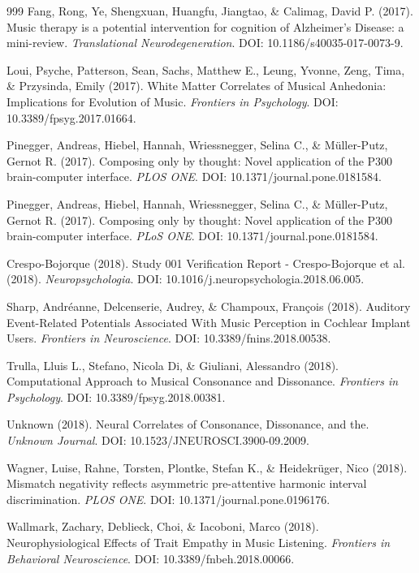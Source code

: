 \documentclass[9pt,onecolumn]{article}
\begin{document}
\begin{thebibliography}{999}
Fang, Rong, Ye, Shengxuan, Huangfu, Jiangtao, \& Calimag, David P. (2017). Music therapy is a potential intervention for cognition of Alzheimer's Disease: a mini-review. \textit{Translational Neurodegeneration}. DOI: 10.1186/s40035-017-0073-9.

Loui, Psyche, Patterson, Sean, Sachs, Matthew E., Leung, Yvonne, Zeng, Tima, \& Przysinda, Emily (2017). White Matter Correlates of Musical Anhedonia: Implications for Evolution of Music. \textit{Frontiers in Psychology}. DOI: 10.3389/fpsyg.2017.01664.

Pinegger, Andreas, Hiebel, Hannah, Wriessnegger, Selina C., \& Müller-Putz, Gernot R. (2017). Composing only by thought: Novel application of the P300 brain-computer interface. \textit{PLOS ONE}. DOI: 10.1371/journal.pone.0181584.

Pinegger, Andreas, Hiebel, Hannah, Wriessnegger, Selina C., \& Müller-Putz, Gernot R. (2017). Composing only by thought: Novel application of the P300 brain-computer interface. \textit{PLoS ONE}. DOI: 10.1371/journal.pone.0181584.

Crespo-Bojorque (2018). Study 001 Verification Report - Crespo-Bojorque et al. (2018). \textit{Neuropsychologia}. DOI: 10.1016/j.neuropsychologia.2018.06.005.

Sharp, Andréanne, Delcenserie, Audrey, \& Champoux, François (2018). Auditory Event-Related Potentials Associated With Music Perception in Cochlear Implant Users. \textit{Frontiers in Neuroscience}. DOI: 10.3389/fnins.2018.00538.

Trulla, Lluis L., Stefano, Nicola Di, \& Giuliani, Alessandro (2018). Computational Approach to Musical Consonance and Dissonance. \textit{Frontiers in Psychology}. DOI: 10.3389/fpsyg.2018.00381.

Unknown (2018). Neural Correlates of Consonance, Dissonance, and the. \textit{Unknown Journal}. DOI: 10.1523/JNEUROSCI.3900-09.2009.

Wagner, Luise, Rahne, Torsten, Plontke, Stefan K., \& Heidekrüger, Nico (2018). Mismatch negativity reflects asymmetric pre-attentive harmonic interval discrimination. \textit{PLOS ONE}. DOI: 10.1371/journal.pone.0196176.

Wallmark, Zachary, Deblieck, Choi, \& Iacoboni, Marco (2018). Neurophysiological Effects of Trait Empathy in Music Listening. \textit{Frontiers in Behavioral Neuroscience}. DOI: 10.3389/fnbeh.2018.00066.


\end{thebibliography}
\end{document}
